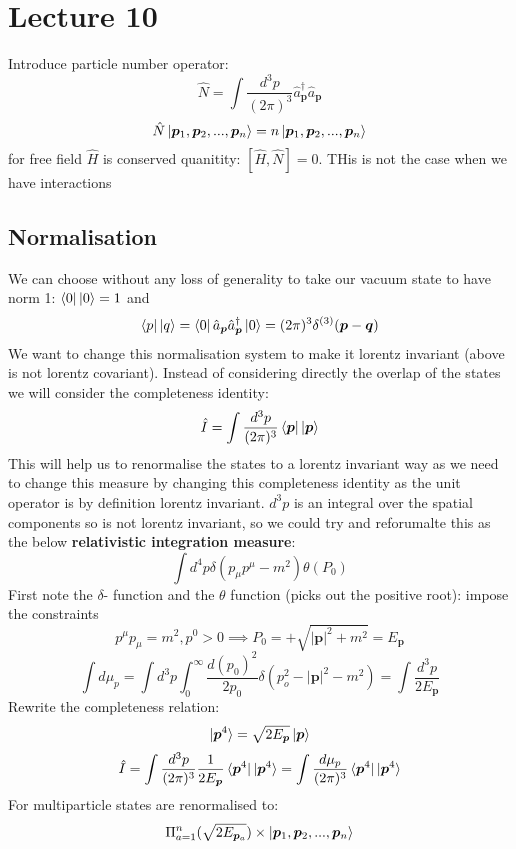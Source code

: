\documentclass[12pt, a4paper, twoside, titlepage]{article}
\begin{document}
\section{Lecture 10}
Introduce particle number operator:
$$
\hat N = \int \frac{d^3p}{(2 \pi)^3} \hat a^{\dagger}_{\bm p} \hat a_{\bm p}
$$
$$
\hat N \ket{\bm p_1, \bm p_2,... , \bm p_n} = n \ket{\bm p_1, \bm p_2,... , \bm p_n} 
$$
for free field $\hat H$ is conserved quanitity: $[\hat H, \hat N] = 0$. THis is not the case when we have interactions
\subsection{Normalisation}
We can choose without any loss of generality to take our vacuum state to have norm 1: $\bra{0}\ket{0} =1$ and
$$
\bra{p} \ket{q} = \bra{0} \hat a_{\bm p} \hat a^{\dagger}_{\bm p} \ket{0} = (2\pi)^3 \delta^{(3)}(\bm p - \bm q)
$$
We want to change this normalisation system to make it lorentz invariant (above is not lorentz covariant). Instead of considering directly the overlap of the states we will consider the completeness identity:
$$
\hat I = \int \frac{d^3p}{(2 \pi)^3} \bra{\bm p}\ket{\bm p}
$$
This will help us to renormalise the states to a lorentz invariant way as we need to change this measure by changing this completeness identity as the unit operator is by definition lorentz invariant. $d^3p$ is an integral over the spatial components so is not lorentz invariant, so we could try and reforumalte this as the below \textbf{relativistic integration measure}:
$$
\int d^4 p \delta (p_{\mu}p^{\mu} - m^2) \theta(P_0)
$$
First note the $\delta$- function and the $\theta$ function (picks out the positive root): impose the constraints 
$$
p^{\mu}p_{\mu} = m^2, p^0 > 0 \implies P_0 = + \sqrt{|\bm p|^2 + m^2} = E_{\bm p}
$$
$$
\int d\mu_p = \int d^3 p \int^{\infty}_0 \frac{d(p_0)^2}{2 p_0} \delta (p_o^2 - |\bm p|^2 - m^2) = \int \frac{d^3 p}{2 E_{\bm p}}
$$
Rewrite the completeness relation:
$$
\ket{\bm p^4} = \sqrt{2 E_{\bm p}} \ket{\bm p}
$$
$$
\hat I = \int \frac{d^3p}{(2 \pi)^3} \frac{1}{2 E_{\bm p}} \bra{\bm p^4}\ket{\bm p^4} = \int \frac{d\mu_p}{(2 \pi)^3} \bra{\bm p^4}\ket{\bm p^4} $$
For multiparticle states are renormalised to:
$$
\Pi_{a=1}^n (\sqrt{2 E_{\bm p_a}}) \times \ket{\bm p_1, \bm p_2,... , \bm p_n}
$$
\end{document}

